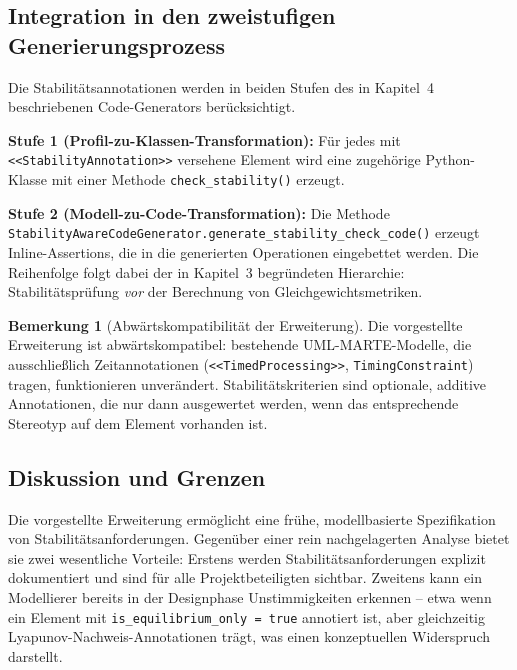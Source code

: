 ﻿\documentclass[a4paper,12pt]{report}
\theoremstyle{definition}
\newtheorem{bemerkung}{Bemerkung}[section]
\begin{document}
\subsection{Integration in den zweistufigen Generierungsprozess}

Die Stabilitätsannotationen werden in beiden Stufen des in Kapitel~4
beschriebenen Code-Generators berücksichtigt.

\textbf{Stufe 1 (Profil-zu-Klassen-Transformation):} Für jedes mit
\texttt{<<StabilityAnnota\newline tion>>} versehene Element wird eine zugehörige
Python-Klasse mit einer Methode \texttt{check\_\newline stability()} erzeugt.

\textbf{Stufe 2 (Modell-zu-Code-Transformation):} Die Methode
\texttt{StabilityAwareCode\newline Generator\allowbreak.generate\_stability\_check\_code()}
erzeugt Inline-Assertions, die in die generierten Operationen eingebettet
werden. Die Reihenfolge folgt dabei der in Kapitel~3 begründeten Hierarchie:
Stabilitätsprüfung \textit{vor} der Berechnung von Gleichgewichtsmetriken.

\begin{bemerkung}[Abwärtskompatibilität der Erweiterung]
	Die vorgestellte Erweiterung ist abwärtskompatibel: bestehende
	UML-MARTE-Modelle, die ausschließlich Zeitannotationen
	(\texttt{<<TimedProcessing>>}, \texttt{TimingConstraint}) tragen,
	funktionieren unverändert. Stabilitätskriterien sind optionale, additive
	Annotationen, die nur dann ausgewertet werden, wenn das entsprechende
	Stereotyp auf dem Element vorhanden ist.
\end{bemerkung}

\subsection{Diskussion und Grenzen}

Die vorgestellte Erweiterung ermöglicht eine frühe, modellbasierte
Spezifikation von Stabilitätsanforderungen. Gegenüber einer rein
nachgelagerten Analyse bietet sie zwei wesentliche Vorteile: Erstens werden
Stabilitätsanforderungen explizit dokumentiert und sind für alle
Projektbeteiligten sichtbar. Zweitens kann ein Modellierer bereits in der
Designphase Unstimmigkeiten erkennen -- etwa wenn ein Element mit
\texttt{is\_equilibrium\_only = true} annotiert ist, aber gleichzeitig
Lyapunov-Nachweis-Annotationen trägt, was einen konzeptuellen Widerspruch
darstellt.
\end{document}
